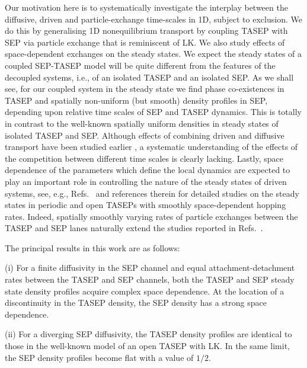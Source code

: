 \documentclass[aps,pre,twocolumn,superscriptaddress,amsmath,amssymb,longbibliography,floatfix]{revtex4}
\begin{document}
Our motivation here is to systematically investigate the interplay between the diffusive, driven and particle-exchange time-scales in 1D,  subject to exclusion. We do this by generalising 1D nonequilibrium transport by coupling
TASEP with SEP via particle exchange that is reminiscent of LK. We also study effects of space-dependent exchanges on the steady states.
We expect the steady states of a coupled SEP-TASEP model will be quite different from the features of the decoupled systems, i.e., of an isolated TASEP and an isolated SEP.
As we shall see, for our coupled system in the steady state we find phase co-existences in 
TASEP and spatially non-uniform (but smooth) density profiles in SEP, depending upon relative time 
scales of SEP and TASEP dynamics. This is totally in contrast to the well-known
spatially uniform densities in steady states of isolated  TASEP
and SEP. Although effects of combining driven and diffusive transport have been studied earlier
\cite{hinsch,old1}, a systematic understanding of the effects of the competition between different time scales is clearly lacking. Lastly, space dependence of the parameters which define the local dynamics are expected to play an important role in controlling the nature of the steady states of driven systems, see, e.g., Refs.~\cite{tirtha-qkpz,sudip-jstat} and references therein for detailed studies on the steady states in periodic and  open TASEPs with smoothly space-dependent hopping rates.   Indeed, spatially smoothly varying rates of particle exchanges between the TASEP and SEP lanes naturally extend the studies reported in Refs.~\cite{tirtha-qkpz,sudip-jstat}. 

The principal results in this work are as follows:

(i) For a finite diffusivity in the SEP channel and equal attachment-detachment rates between the TASEP and SEP channels, both the TASEP and SEP steady state density profiles acquire complex space dependence. At the location of a discontinuity in the TASEP density, the SEP density has a strong space dependence.

(ii) For a diverging SEP diffusivity, the TASEP density profiles are identical to those in the well-known model of an open TASEP with LK. In the same limit, the SEP density profiles become flat with a value of $1/2$.
\end{document}
